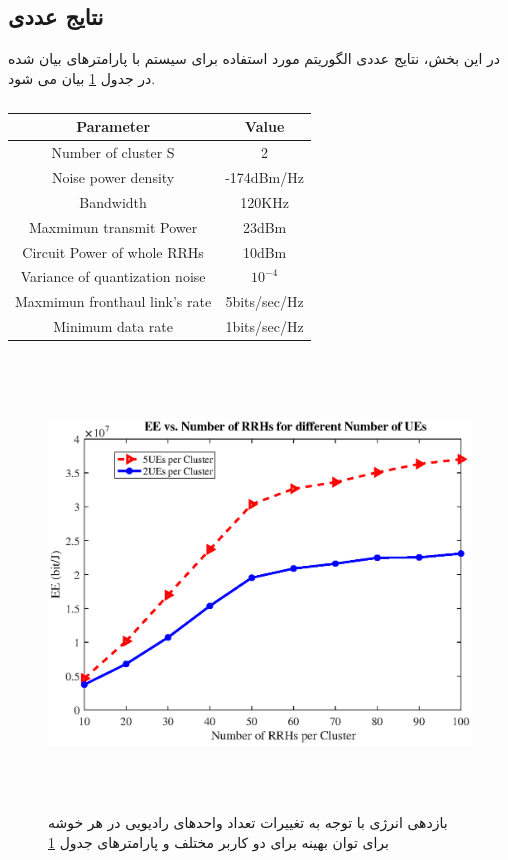 \subsection{نتایج عددی}
در این بخش، نتایج عددی الگوریتم مورد استفاده برای سیستم  با پارامترهای بیان شده در جدول \ref{tab:title} بیان می شود.
\begin{latin} 
 \begin{table}[H]
 \caption {} \label{tab:title} 
 \begin{center}
  \begin{tabular}{||c c ||} 
  \hline
  Parameter & Value \\ [0.5ex] 
  \hline\hline
  Number of cluster S & 2 \\ 
  \hline
  Noise power density & -174dBm/Hz\\
  \hline
  Bandwidth & 120KHz \\
  \hline
 Maxmimun transmit Power & 23dBm \\
  \hline
  Circuit Power of whole RRHs & 10dBm \\
  \hline
  Variance of quantization noise & $10^{-4}$ \\
  \hline
   Maxmimun fronthaul link's rate & 5bits/sec/Hz \\
  \hline
  Minimum data rate &  1bits/sec/Hz \\ [1ex] 
  \hline
 \end{tabular}
 \end{center}
 \end{table}
 \end{latin}
  \begin{figure}[h]
  \centering
    \includegraphics[width=\linewidth, height=12cm]{./fig3/rrh}
  \caption{
  بازدهی انرژی با توجه به تغییرات تعداد واحدهای رادیویی در هر خوشه برای توان بهینه برای 
   دو کاربر مختلف
   و پارامترهای جدول \ref{tab:title}}
  \label{fig:nem1}
\end{figure}
